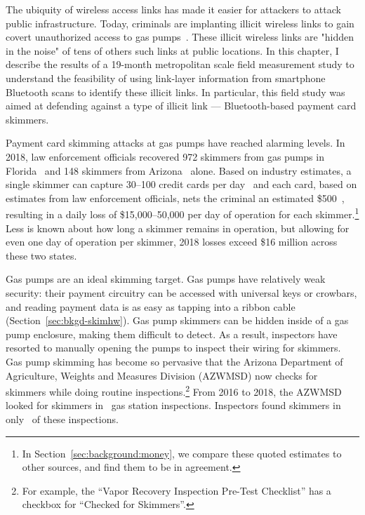 \label{sec:intro}

The ubiquity of wireless access links has made it easier for attackers to attack public infrastructure. Today, criminals are implanting illicit wireless links to gain covert unauthorized access to gas pumps~\cite{arizona-2018,florida-2018}.
%
These illicit wireless links are "hidden in the noise" of tens of others such links at public locations.
%
In this chapter, I describe the results of a 19-month metropolitan scale field measurement study to understand the feasibility of using link-layer information from smartphone Bluetooth scans to identify these illicit links.
%
In particular, this field study was aimed at defending against a type of illicit link --- Bluetooth-based payment card skimmers.
%


Payment card skimming attacks at gas pumps have reached alarming levels.
%
In 2018, law enforcement officials recovered 972 skimmers from gas pumps in Florida~\cite{florida-2018} and 148 skimmers from Arizona~\cite{arizona-2018} alone.
Based on industry estimates, a single skimmer can capture 30--100 credit cards per day~\cite{rippleshot} and each card, based on estimates from law enforcement officials, nets the criminal an estimated \$500~\cite{ussc-guidelines}, resulting in a daily loss of \$15,000--50,000 per day of operation for each skimmer.\footnote{In Section~\ref{sec:background:money}, we compare these quoted estimates to other sources, and find them to be in agreement.} Less is known about how long a skimmer remains in operation, but allowing for even one day of operation per skimmer, 2018 losses exceed \$16 million across these two states.

Gas pumps are an ideal skimming target.
%
Gas pumps have relatively weak security: their payment circuitry can be accessed with universal keys or crowbars, and reading payment data is as easy as tapping into a ribbon cable (Section~\ref{sec:bkgd-skimhw}).
% 
Gas pump skimmers can be hidden inside of a gas pump enclosure, making them difficult to detect.
% 
As a result, inspectors have resorted to manually opening the pumps to inspect their wiring for skimmers.
% 
Gas pump skimming has become so pervasive that the Arizona Department of Agriculture, Weights and Measures Division (AZWMSD) now checks for skimmers while doing routine inspections.\footnote{For example,
the ``Vapor Recovery Inspection Pre-Test Checklist'' has a checkbox for ``Checked for Skimmers''.}
%
From 2016 to 2018, the AZWMSD looked for skimmers in \azskiminspect~gas station inspections.
%
Inspectors found skimmers in only \azpercentskimfound~of these inspections.

